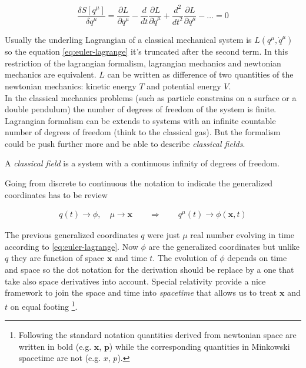 \begin{equation} \label{eq:euler-lagrange}
    \frac{\delta S[q^{\mu}]}{\delta q^{\mu}} =
    \frac{\partial L}{\partial q^{\mu}} -
    \frac{d}{dt}\frac{\partial L}{\partial \dot{q}^{\mu}} +
    \frac{d^2}{dt^2}\frac{\partial L}{\partial \ddot{q}^{\mu}} -
    \ldots = 0
\end{equation}

Usually the underling Lagrangian of a classical mechanical system is $L(q^{\mu},
\dot{q}^{\mu})$ so the equation \eqref{eq:euler-lagrange} it's truncated after
the second term. In this restriction of the lagrangian formalism, lagrangian
mechanics and newtonian mechanics are equivalent. $L$ can be written as
difference of two quantities of the newtonian mechanics: kinetic energy $T$ and
potential energy $V$. \\

In the classical mechanics problems (such as particle constrains on a surface or
a double pendulum) the number of degrees of freedom of the system is finite.
Lagrangian formalism can be extends to systems with an infinite countable number
of degrees of freedom (think to the classical gas). But the formalism could be
push further more and be able to describe \emph{classical fields}.

\begin{definition}\label{def: classical field}
  \cite{Aldrovandi19_classical_field}
  A \emph{classical field} is a system with a continuous infinity of degrees of
  freedom.
\end{definition}

Going from discrete to continuous the notation to indicate the generalized
coordinates has to be review

\begin{align*}
  q(t) \rightarrow \phi, \quad \mu \rightarrow \bm{x}
  \qquad \Rightarrow \qquad
  q^{\mu}(t) \rightarrow \phi(\bm{x},t)
\end{align*}

The previous generalized coordinates $q$ were just $\mu$ real number evolving in
time according to \eqref{eq:euler-lagrange}. Now $\phi$ are the generalized
coordinates but unlike $q$ they are function of space $\bm{x}$ and time $t$. The
evolution of $\phi$ depends on time and space so the dot notation for the
derivation should be replace by a one that take also space derivatives
into account. Special relativity provide a nice framework to join the space and
time into \emph{spacetime} that allows us to treat $\bm{x}$ and $t$ on equal
footing
\footnote{
  Following the standard notation quantities derived from newtonian space are
  written in bold (e.g. $\bm{x}$, $\bm{p}$) while the corresponding quantities
  in Minkowski spacetime are not (e.g. $x$, $p$).
}.

